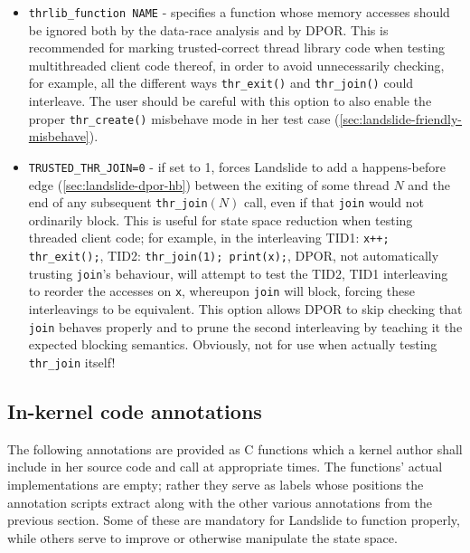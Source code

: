 \begin{itemize}
		{\tt USERSPACE} should be 0 or 1 to denote a kernel-space or user-space function respectively.
	\item {\tt thrlib\_function NAME} - specifies a function whose memory accesses should be ignored both by the data-race analysis and by DPOR.
		This is recommended for marking trusted-correct thread library code when testing multithreaded client code thereof,
		in order to avoid unnecessarily checking, for example,
		all the different ways {\tt thr\_exit()} and {\tt thr\_join()} could interleave.
		The user should be careful with this option to also enable the proper {\tt thr\_create()} misbehave mode
		in her test case (\cref{sec:landslide-friendly-misbehave}).
	\item {\tt TRUSTED\_THR\_JOIN=0} - if set to 1, forces Landslide to add a happens-before edge (\cref{sec:landslide-dpor-hb}) between the exiting of some thread $N$ and the end of any subsequent {\tt thr\_join}$(N)$ call,
		even if that {\tt join} would not ordinarily block.
		This is useful for state space reduction when testing threaded client code;
		for example,
		in the interleaving
		TID1: {\tt x++; thr\_exit();},
		TID2: {\tt thr\_join(1); print(x);},
		DPOR, not automatically trusting {\tt join}'s behaviour,
		will attempt to test the TID2, TID1 interleaving to reorder the accesses on {\tt x},
		whereupon {\tt join} will block, forcing these interleavings to be equivalent.
		This option allows DPOR to skip checking that {\tt join} behaves properly
		and to prune the second interleaving
		by teaching it the expected blocking semantics. %
		Obviously, not for use when actually testing {\tt thr\_join} itself!
\end{itemize}


\subsection{In-kernel code annotations}
\label{sec:tell-landslide}

The following annotations are provided as C functions
which a kernel author shall include in her source code and call at appropriate times.
The functions' actual implementations are empty;
rather they serve as labels whose positions the annotation scripts extract
along with the other various annotations from the previous section.
Some of these are mandatory for Landslide to function properly,
while others serve to improve or otherwise manipulate the state space.

